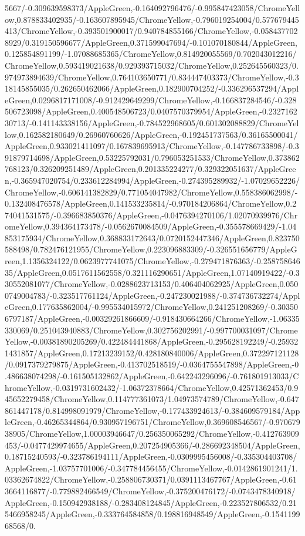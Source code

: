 {\begin{tikzternal}
5667/-0.309639598373/AppleGreen,-0.164092796476/-0.995847423058/ChromeYellow,0.878833402935/-0.163607895945/ChromeYellow,-0.796019254004/0.577679445413/ChromeYellow,-0.393501900017/0.940784855166/ChromeYellow,-0.0584377028929/0.319150596677/AppleGreen,0.371599047694/-0.101070180844/AppleGreen,0.125854891199/-1.07088685365/ChromeYellow,0.814920055569/0.702043012216/ChromeYellow,0.593419021638/0.929393715032/ChromeYellow,0.252645560323/0.974973894639/ChromeYellow,0.764103650771/0.834447403373/ChromeYellow,-0.318145855035/0.262650462066/AppleGreen,0.182900704252/-0.336296537294/AppleGreen,0.0296817171008/-0.912429649299/ChromeYellow,-0.166837284546/-0.328506723098/AppleGreen,0.400548506723/0.0407570379954/AppleGreen,-0.232716230713/-0.141143338156/AppleGreen,-0.784522968605/0.601302088829/ChromeYellow,0.162582180649/0.26960760626/AppleGreen,-0.192451737563/0.36165500041/AppleGreen,0.933021411097/0.167839695913/ChromeYellow,-0.147786733898/-0.391879714698/AppleGreen,0.53225792031/0.796053251533/ChromeYellow,0.373862768123/0.326209251489/AppleGreen,0.201335224277/0.329322051637/AppleGreen,-0.365947020754/0.233612284994/AppleGreen,-0.274395289932/-1.07029652226/ChromeYellow,-0.606141382829/0.771054047982/ChromeYellow,0.558386062998/-0.132408476578/AppleGreen,0.141533235814/-0.970184206864/ChromeYellow,0.274041531575/-0.396683850376/AppleGreen,-0.0476394270106/1.02070939976/ChromeYellow,0.394364173478/-0.0562670084509/AppleGreen,-0.355578669429/-1.04853175934/ChromeYellow,0.368833172643/0.0720152447346/AppleGreen,0.823750588498/0.782476121955/ChromeYellow,0.223096883309/-0.326551656779/AppleGreen,1.1356324122/0.0623977741075/ChromeYellow,-0.279471876363/-0.25875864635/AppleGreen,0.0517611562558/0.321116290651/AppleGreen,1.07140919422/-0.330552081077/ChromeYellow,-0.0288623713153/0.406404062925/AppleGreen,0.0500749004783/-0.323517761124/AppleGreen,-0.247230021988/-0.374736732274/AppleGreen,0.177635862004/-0.995534015972/ChromeYellow,0.241251208269/-0.303506797187/AppleGreen,-0.00329261866609/-0.918430664266/ChromeYellow,-1.06335330069/0.251043940883/ChromeYellow,0.302756202991/-0.997700031097/ChromeYellow,-0.00381890205269/0.422484441868/AppleGreen,-0.295628192249/-0.259321431857/AppleGreen,0.17213239152/0.428180840006/AppleGreen,0.372297121128/0.0917379279875/AppleGreen,-0.413702518519/-0.0364755547898/AppleGreen,-0.486638074298/-0.161505132862/AppleGreen,-0.642243296096/-0.761801913033/ChromeYellow,-0.0319731602432/-1.06372378664/ChromeYellow,0.42571362453/0.945652279458/ChromeYellow,0.114777361073/1.04973574789/ChromeYellow,-0.647861447178/0.814998091979/ChromeYellow,-0.177433924613/-0.384609579184/AppleGreen,-0.46265344864/0.930957196751/ChromeYellow,0.369608546567/-0.97067938905/ChromeYellow,1.00003946647/0.256350065292/ChromeYellow,-0.412763909453/-0.0477429974655/AppleGreen,0.207254905366/-0.286692348504/AppleGreen,0.18715240593/-0.323786194111/AppleGreen,-0.0309995456008/-0.335304403708/AppleGreen,-1.03757701006/-0.347784456455/ChromeYellow,-0.0142861901241/1.03362674822/ChromeYellow,-0.258806730371/0.0391113467767/AppleGreen,-0.613664116877/-0.779882466549/ChromeYellow,-0.375200476172/-0.0743478340918/AppleGreen,-0.150942938188/-0.283408124845/AppleGreen,-0.223527806532/0.215466958245/AppleGreen,-0.333764584858/0.198816948549/AppleGreen,-0.154119968568/0.
\end{tikzternal}}
